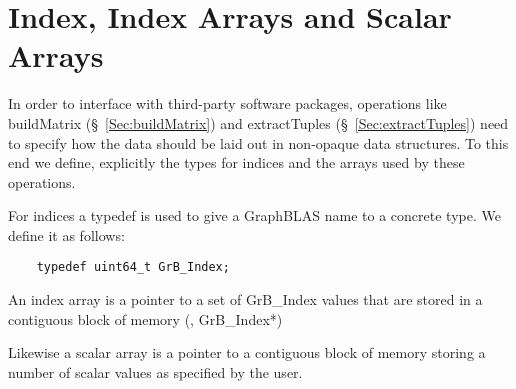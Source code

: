 \section{Index, Index Arrays and Scalar Arrays}

In order to interface with third-party software packages, operations like
buildMatrix (\S~\ref{Sec:buildMatrix})
and extractTuples (\S~\ref{Sec:extractTuples}) need to specify how the data should be
laid out in  non-opaque data structures.  To this end we define, explicitly
the types for indices and the arrays used by these operations.

For indices a typedef is used to give a GraphBLAS name to a concrete type. We define it as follows:

\begin{verbatim}
    typedef uint64_t GrB_Index;
\end{verbatim}

An index array is a pointer to a set of {\sf GrB\_Index} values that are stored in a contiguous block of memory (\ie, {\sf GrB\_Index*})

Likewise a scalar array is a pointer to a contiguous block of memory storing a number of scalar values as specified by the user.
